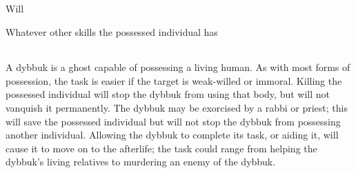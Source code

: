 \documentclass{book}
\begin{document}
\begin{npcBox}[title=Dybbuk]

\begin{aspects}
\item {}
\item {}
\item {}
\end{aspects}

\begin{skills}
\item {} Will
\item Whatever other skills the possessed individual has
\end{skills}

\begin{stunts}
\item {}
\end{stunts}

\begin{stressSection}
\end{stressSection}
\begin{tabularx}{\textwidth}{ XX }
\end{tabularx}

\begin{consequences}
\item {}
\item {}
\item {}
\end{consequences}


\begin{npcDescription}
A dybbuk is a ghost capable of possessing a living human. As with most forms of possession, the task is easier if the target is weak-willed or immoral. Killing the possessed individual will stop the dybbuk from using that body, but will not vanquish it permanently. The dybbuk may be exorcised by a rabbi or priest; this will save the possessed individual but will not stop the dybbuk from possessing another individual. Allowing the dybbuk to complete its task, or aiding it, will cause it to move on to the afterlife; the task could range from helping the dybbuk’s living relatives to murdering an enemy of the dybbuk. 
\end{npcDescription}

\end{npcBox}
\end{document}
